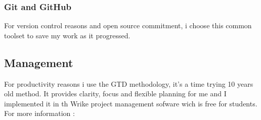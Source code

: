 			\subsubsection{Git and GitHub}
For version control reasons and open source commitment, i choose this common toolset to save my work as it progressed.
\cite{Github}
		\subsection{Management}
For productivity reasons i use the GTD\cite{GTD} methodology, it's a time trying 10 years old method. It provides clarity, focus and flexible planning for me and I implemented it in th Wrike \cite{WRIKE} project management sofware wich is free for students. For more information : \cite{WRIKE_for_students}